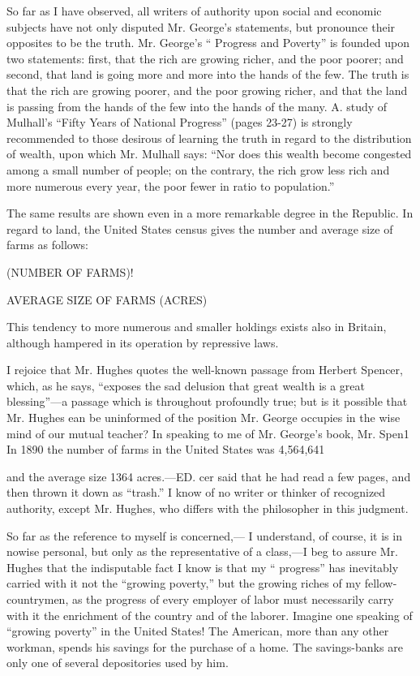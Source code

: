 \documentclass[11pt,openany]{book}
\begin{document}
So far as I have observed, all writers of authority upon social and economic subjects have not only disputed Mr. George's statements, but pronounce their opposites to be the truth. Mr. George's `` Progress and Poverty'' is founded upon two statements: first, that the rich are growing richer, and the poor poorer; and second, that land is going more and more into the hands of the few. The truth is that the rich are growing poorer, and the poor growing richer, and that the land is passing from the hands of the few into the hands of the many. A. study of Mulhall's ``Fifty Years of National Progress'' (pages 23-27) is strongly recommended to those desirous of learning the truth in regard to the distribution of wealth, upon which Mr. Mulhall says: ``Nor does this wealth become congested among a small number of people; on the contrary, the rich grow less rich and more numerous every year, the poor fewer in ratio to population.''

The same results are shown even in a more remarkable degree in the Republic. In regard to land, the United States census gives the number and average size of farms as follows:

(NUMBER OF FARMS)!

AVERAGE SIZE OF FARMS (ACRES)

This tendency to more numerous and smaller holdings exists also in Britain, although hampered in its operation by repressive laws.

I rejoice that Mr. Hughes quotes the well-known passage from Herbert Spencer, which, as he says, ``exposes the sad delusion that great wealth is a great blessing''---a passage which is throughout profoundly true; but is it possible that Mr. Hughes ean be uninformed of the position Mr. George occupies in the wise mind of our mutual teacher? In speaking to me of Mr. George's book, Mr. Spen1 In 1890 the number of farms in the United States was 4,564,641

and the average size 1364 acres.---ED. cer said that he had read a few pages, and then thrown it down as ``trash.'' I know of no writer or thinker of recognized authority, except Mr. Hughes, who differs with the philosopher in this judgment.

So far as the reference to myself is concerned,--- I understand, of course, it is in nowise personal, but only as the representative of a class,---I beg to assure Mr. Hughes that the indisputable fact I know is that my `` progress'' has inevitably carried with it not the ``growing poverty,'' but the growing riches of my fellow-countrymen, as the progress of every employer of labor must necessarily carry with it the enrichment of the country and of the laborer. Imagine one speaking of ``growing poverty'' in the United States! The American, more than any other workman, spends his savings for the purchase of a home. The savings-banks are only one of several depositories used by him.
\end{document}
